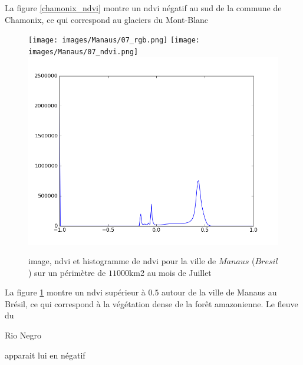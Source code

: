 \documentclass{book}
\begin{document}
La figure \ref{chamonix_ndvi} montre un ndvi négatif au sud de la commune de Chamonix, ce qui correspond au glaciers du Mont-Blanc\\

\clearpage 

\begin{figure}[H]
\begin{center}
\texttt{[image: images/Manaus/07\_rgb.png]}
\texttt{[image: images/Manaus/07\_ndvi.png]}
\includegraphics[scale=0.45]{images/Manaus/07_ndvi_histo.png}
\end{center}
\caption{image, ndvi et histogramme de ndvi pour la ville de $Manaus$ ($Bresil$) sur un périmètre de $11000$km2 au mois de Juillet}
\label{manaus_ndvi}
\end{figure}

La figure \ref{manaus_ndvi} montre un ndvi supérieur à $0.5$ autour de la ville de Manaus au Brésil, ce qui correspond à la végétation dense de la for\^et amazonienne. Le fleuve
du \begin{itshape}Rio Negro\end{itshape} apparait lui en négatif\\

\clearpage
\end{document}
